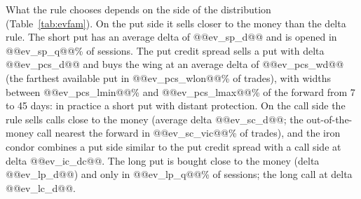\documentclass[11pt,a4paper]{article}
\begin{document}
\begin{table}[ht]\centering\footnotesize
\caption{Combination chosen by maximum expected value per contract under the GARCH density, by family, 2012--2023, held to expiry. Share of sessions with a trade (positive expected value), average absolute market delta of the main leg (sold leg; bought leg for long options; put/call for the iron condor), width as a percentage of the forward, expected and realized return per trade on margin (on premium for long options), Sharpe ratio of the monthly ladder (median of the four expiries); Sharpe ratio of the delta rule at bid-ask prices, median and maximum of the sixteen configurations (four levels, four expiries), and number of expiries out of four in which the EV rule is above the delta median.}\label{tab:evfam}
\end{table}

What the rule chooses depends on the side of the distribution (Table~\ref{tab:evfam}). On the put side it sells closer to the money than the delta rule. The short put has an average delta of @@ev_sp_d@@ and is opened in @@ev_sp_q@@\% of sessions. The put credit spread sells a put with delta @@ev_pcs_d@@ and buys the wing at an average delta of @@ev_pcs_wd@@ (the farthest available put in @@ev_pcs_wlon@@\% of trades), with widths between @@ev_pcs_lmin@@\% and @@ev_pcs_lmax@@\% of the forward from 7 to 45 days: in practice a short put with distant protection. On the call side the rule sells calls close to the money (average delta @@ev_sc_d@@; the out-of-the-money call nearest the forward in @@ev_sc_vic@@\% of trades), and the iron condor combines a put side similar to the put credit spread with a call side at delta @@ev_ic_dc@@. The long put is bought close to the money (delta @@ev_lp_d@@) and only in @@ev_lp_q@@\% of sessions; the long call at delta @@ev_lc_d@@.
\end{document}
